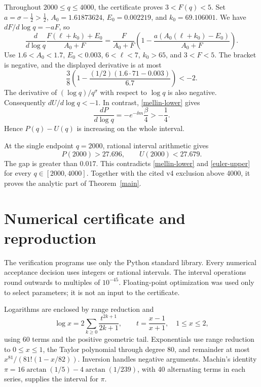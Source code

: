 \documentclass[11pt]{article}
\begin{document}
Throughout \(2000\le q\le4000\), the certificate proves \(3<F(q)<5\).
Set \(a=\sigma-\tfrac12>\tfrac12\),
\(A_0=1.61873624\), \(E_0=0.002219\), and \(k_0=69.106001\).
We have \(dF/d\log q=-aF\), so
\[
 \frac{d}{d\log q}\frac{F(\ell+k_0)+E_0}{A_0+F}
 =\frac{F}{A_0+F}
  \left(1-\frac{a(A_0(\ell+k_0)-E_0)}{A_0+F}\right).
\]
Use \(1.6<A_0<1.7\), \(E_0<0.003\), \(6<\ell<7\),
\(k_0>65\), and \(3<F<5\). The bracket is negative, and the
displayed derivative is at most
\[
 \frac38\left(1-\frac{(1/2)(1.6\cdot71-0.003)}{6.7}\right)<-2.
\]
The derivative of \((\log q)/q^\sigma\) with respect to \(\log q\)
is also negative. Consequently \(dU/d\log q<-1\).
In contrast, \eqref{mellin-lower} gives
\[
 \frac{dP}{d\log q}=-e^{-\delta m}\frac{\beta}{4}>-\frac14.
\]
Hence \(P(q)-U(q)\) is increasing on the whole interval.

At the single endpoint \(q=2000\), rational interval arithmetic gives
\[
 P(2000)>27.696,\qquad U(2000)<27.679.
\]
The gap is greater than \(0.017\). This contradicts
\eqref{mellin-lower} and \eqref{euler-upper} for every
\(q\in[2000,4000]\). Together with the cited v4 exclusion above
4000, it proves the analytic part of Theorem~\ref{main}.

\section{Numerical certificate and reproduction}\label{certificate}

The verification programs use only the Python standard library.
Every numerical acceptance decision uses integers or rational intervals.
The interval operations round outwards to multiples of \(10^{-45}\).
Floating-point optimization was used only to select parameters; it is
not an input to the certificate.

Logarithms are enclosed by range reduction and
\[
 \log x=2\sum_{k\ge0}\frac{t^{2k+1}}{2k+1},\qquad
 t=\frac{x-1}{x+1},\quad 1\le x\le2,
\]
using 60 terms and the positive geometric tail.
Exponentials use range reduction to \(0\le x\le1\), the Taylor
polynomial through degree 80, and remainder at most
\(x^{81}/(81!(1-x/82))\). Inversion handles negative arguments.
Machin's identity
\(\pi=16\arctan(1/5)-4\arctan(1/239)\), with 40 alternating terms
in each series, supplies the interval for \(\pi\).
\end{document}
